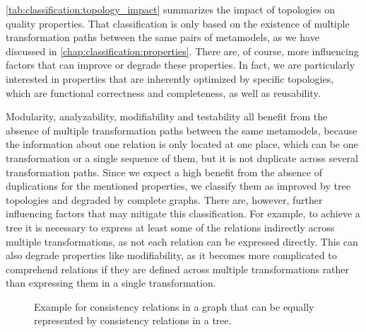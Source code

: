 \autoref{tab:classification:topology_impact} summarizes the impact of topologies on quality properties.
That classification is only based on the existence of multiple transformation paths between the same pairs of metamodels, as we have discussed in \autoref{chap:classification:properties}.
There are, of course, more influencing factors that can improve or degrade these properties.
In fact, we are particularly interested in properties that are inherently optimized by specific topologies, which are functional correctness and completeness, as well as reusability.

Modularity, analyzability, modifiability and testability all benefit from the absence of multiple transformation paths between the same metamodels, because the information about one relation is only located at one place, which can be one transformation or a single sequence of them, but it is not duplicate across several transformation paths.
Since we expect a high benefit from the absence of duplications for the mentioned properties, we classify them as improved by tree topologies and degraded by complete graphs.
There are, however, further influencing factors that may mitigate this classification.
For example, to achieve a tree it is necessary to express at least some of the relations indirectly across multiple transformations, as not each relation can be expressed directly.
This can also degrade properties like modifiability, as it becomes more complicated to comprehend relations if they are defined across multiple transformations rather than expressing them in a single transformation.

\begin{figure}
    \centering
    
    \caption[Reducibility of graph to tree]{Example for consistency relations in a graph that can be equally represented by consistency relations in a tree.}
    \label{fig:classification:tree_generation}
\end{figure}

